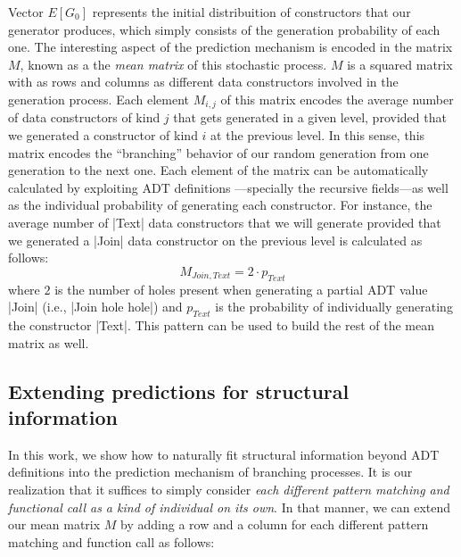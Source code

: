 Vector $E[G_0]$ represents the initial distribuition of constructors that our
generator produces, which simply consists of the generation probability of each
one.
%
The interesting aspect of the prediction mechanism is encoded in the matrix $M$,
known as a the \emph{mean matrix} of this stochastic process.
%
$M$ is a squared matrix with as rows and columns as different data constructors
involved in the generation process.
%
Each element $M_{i,j}$ of this matrix encodes the average number of data
constructors of kind $j$ that gets generated in a given level, provided that we
generated a constructor of kind $i$ at the previous level.
%
In this sense, this matrix encodes the ``branching'' behavior of our random
generation from one generation to the next one.
%
Each element of the matrix can be automatically calculated by exploiting ADT
definitions \cite{DBLP:conf/haskell/MistaRH18}---specially the recursive
fields---as well as the individual probability of generating each constructor.
%
For instance, the average number of |Text| data constructors that we will
generate provided that we generated a |Join| data constructor on the previous
level is calculated as follows:
%
$$ M_{Join, Text} = 2\cdot p_{Text} $$
%
where $2$ is the number of holes present when generating a partial ADT value
|Join| (i.e., |Join hole hole|) and $p_{Text}$ is the probability of
individually generating the constructor |Text|.
%
This pattern can be used to build the rest of the mean matrix as well.



\subsection{Extending predictions for structural information}

In this work, we show how to naturally fit structural information beyond ADT
definitions into the prediction mechanism of branching processes.
%
It is our realization that it suffices to simply consider \emph{each different
  pattern matching and functional call as a kind of individual on its own}.
%
In that manner, we can extend our mean matrix $M$ by adding a row and a column
for each different pattern matching and function call as follows:


